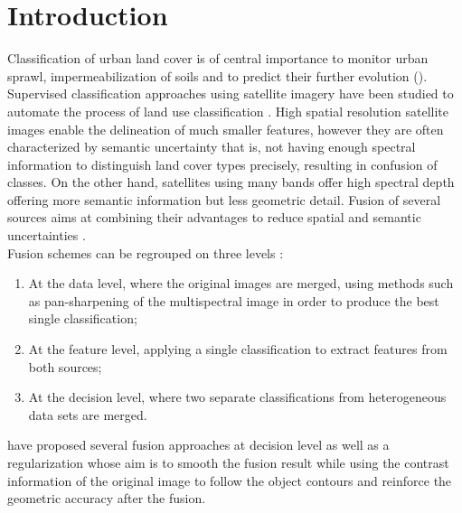 \documentclass[10pt]{article}
\begin{document}
\makeMATIS


\tableofcontents
\newpage
\section{Introduction}

Classification of urban land cover is of central importance to monitor urban sprawl, impermeabilization of soils and to predict their further evolution (\cite{kurtz_histogram_2012,kurtz_extraction_2012,wemmert_multiresolution_2009,Lefebvre_2016}). Supervised classification approaches using satellite imagery have been studied to automate the process of land use classification \parencite{inglada_operational_2017,li_urban_2016,Pesaresi_2016}. High spatial resolution satellite images enable the delineation of much smaller features, however they are often characterized by semantic uncertainty that is, not having enough spectral information to distinguish land cover types precisely, resulting in confusion of classes. On the other hand, satellites using many bands offer high spectral depth offering more semantic information but less geometric detail. Fusion of several sources aims at combining their advantages to reduce spatial and semantic uncertainties \parencite{ouerghemmi_two-step_2017,fauvel_decision_fusion,hervieu_fusion_2016}. \\

Fusion schemes can be regrouped on three levels \parencite{ouerghemmi_two-step_2017}:
\begin{enumerate}
    \item At the data level, where the original images are merged, using methods such as pan-sharpening of the multispectral image in order to produce the best single classification;
    \item At the feature level, applying a single classification to extract features from both sources;
    \item At the decision level, where two separate classifications from heterogeneous data sets are merged.
\end{enumerate}

\cite{ouerghemmi_two-step_2017} have proposed several fusion approaches at decision level as well as a regularization whose aim is to smooth the fusion result while using the contrast information of the original image to follow the object contours and reinforce the geometric accuracy after the fusion. \\
\end{document}
